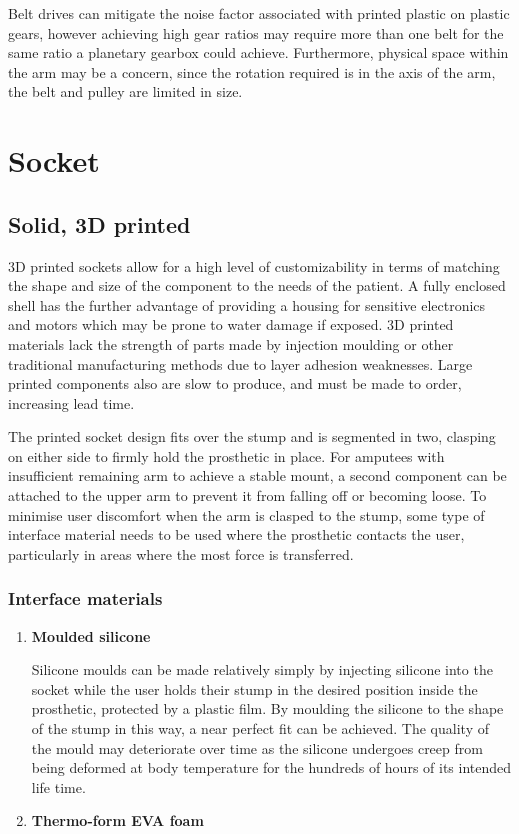 \documentclass[11pt,3p]{report}
\begin{document}
\begin{multicols}{2}
\begin{enumerate}[noitemsep]
{Belt drives can mitigate the noise factor associated with printed plastic on plastic gears, however achieving high gear ratios may require more than one belt for the same ratio a planetary gearbox could achieve. Furthermore, physical space within the arm may be a concern, since the rotation required is in the axis of the arm, the belt and pulley are limited in size.
			}	
			\end{enumerate}


	
	
	\section{Socket}
		
		\subsection{Solid, 3D printed}
		3D printed sockets allow for a high level of customizability in terms of matching the shape and size of the component to the needs of the patient. A fully enclosed shell has the further advantage of providing a housing for sensitive electronics and motors which may be prone to water damage if exposed. 3D printed materials lack the strength of parts made by injection moulding or other traditional manufacturing methods due to layer adhesion weaknesses. Large printed components also are slow to produce, and must be made to order, increasing lead time.
		
		The printed socket design fits over the stump and is segmented in two, clasping on either side to firmly hold the prosthetic in place. For amputees with insufficient remaining arm to achieve a stable mount, a second component can be attached to the upper arm to prevent it from falling off or becoming loose. To minimise user discomfort when the arm is clasped to the stump, some type of interface material needs to be used where the prosthetic contacts the user, particularly in areas where the most force is transferred.
		
			\subsubsection{Interface materials}		
		\begin{enumerate}[noitemsep]
		\item \textbf{Moulded silicone} {
		
		Silicone moulds can be made relatively simply by injecting silicone into the socket while the user holds their stump in the desired position inside the prosthetic, protected by a plastic film. By moulding the silicone to the shape of the stump in this way, a near perfect fit can be achieved. The quality of the mould may deteriorate over time as the silicone undergoes creep from being deformed at body temperature for the hundreds of hours of its intended life time. 
		}
		\item \textbf{Thermo-form EVA foam} {
		 
}
\end{enumerate}
\end{multicols}
\end{document}
